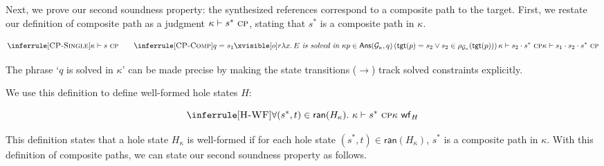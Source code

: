 Next, we prove our second soundness property: the synthesized references correspond to a composite path to the target.
%
First, we restate our definition of composite path as a judgment $\kappa \vdash s^{\ast} \ \textsc{cp}$, stating that $s^{\ast}$ is a composite path in $\kappa$.
\begin{definition}
  \[
    \inferrule[\textsc{CP-Single}]{
    }{
      \kappa \vdash s \ \textsc{cp}
    }
    \qquad
    \inferrule[\textsc{CP-Comp}]{
      q = \qBase{o}{s_1}{r}{\lambda x.\, E} \textit{ is solved in } \kappa
      \\
      p \in \mathsf{Ans}(\SG_\kappa, q)
      \\
      \left(\mathsf{tgt}(p) = s_2 \lor s_2 \in \rho_{\SG_{\kappa}}(\mathsf{tgt}(p)) \right)
      \\
      \kappa \vdash s_2 \cdot s^{*} \ \textsc{cp}
    }{
      \kappa
      \vdash
        s_1 \cdot s_2 \cdot s^{*} \ \textsc{cp}
    }
  \]
\end{definition}
\begin{remark}
    The phrase `$q$ is solved in $\kappa$' can be made precise by making the state transitions ($\rightarrow$) track solved constraints explicitly.
\end{remark}
%
We use this definition to define well-formed hole states $H$:
\begin{definition}
  \[
    \inferrule[\textsc{H-WF}]{
      \forall (s^{\ast}, t) \in \mathsf{ran}(H_\kappa).\ \kappa \vdash s^{\ast} \  \textsc{cp}
    }{
      \kappa \  \mathsf{wf}_H
    }
  \]
\end{definition}

This definition states that a hole state $H_\kappa$ is well-formed if for each hole state $(s^{\ast}, t) \in \mathsf{ran}(H_\kappa)$, $s^{\ast}$ is a composite path in $\kappa$.
With this definition of composite paths, we can state our second soundness property as follows.


